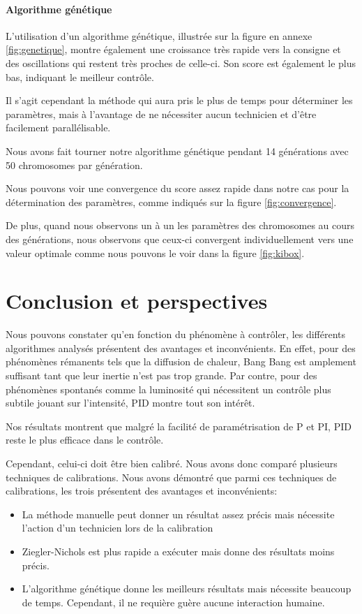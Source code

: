 \documentclass[a4paper,10pt]{report}
\begin{document}
\subsubsection{Algorithme génétique}
L'utilisation d'un algorithme génétique, illustrée sur la figure en annexe \ref{fig:genetique}, montre également une croissance très rapide vers la consigne et des oscillations qui restent très proches de celle-ci.
Son score est également le plus bas, indiquant le meilleur contrôle.

Il s'agit cependant la méthode qui aura pris le plus de temps pour déterminer les paramètres, mais à l'avantage de ne nécessiter aucun technicien et d'être facilement parallélisable.

Nous avons fait tourner notre algorithme génétique pendant 14 générations avec 50 chromosomes par génération.

Nous pouvons voir une convergence du score assez rapide dans notre cas pour la détermination des paramètres, comme indiqués sur la figure \ref{fig:convergence}.

De plus, quand nous observons un à un les paramètres des chromosomes au cours des générations, nous observons que ceux-ci convergent individuellement vers une valeur optimale comme nous pouvons le voir dans la figure \ref{fig:kibox}.


\chapter{Conclusion et perspectives}

Nous pouvons constater qu'en fonction du phénomène à contrôler, les différents algorithmes analysés présentent des avantages et inconvénients.
En effet, pour des phénomènes rémanents tels que la diffusion de chaleur, Bang Bang est amplement suffisant tant que leur inertie n'est pas trop grande.
Par contre, pour des phénomènes spontanés comme la luminosité qui nécessitent un contrôle plus subtile jouant sur l'intensité, PID montre tout son intérêt.

Nos résultats montrent que malgré la facilité de paramétrisation de P et PI, PID reste le  plus efficace dans le contrôle.

Cependant, celui-ci doit être bien calibré.
Nous avons donc comparé plusieurs techniques de calibrations.
Nous avons démontré que parmi ces techniques de calibrations, les trois présentent des avantages et inconvénients:
\begin{itemize}
    \item La méthode manuelle peut donner un résultat assez précis mais nécessite l'action d'un technicien lors de la calibration
    \item Ziegler-Nichols est plus rapide a exécuter mais donne des résultats moins précis.
    \item L'algorithme génétique donne les meilleurs résultats mais nécessite beaucoup de temps. Cependant, il ne requière guère aucune interaction humaine.
\end{itemize}
\end{document}
